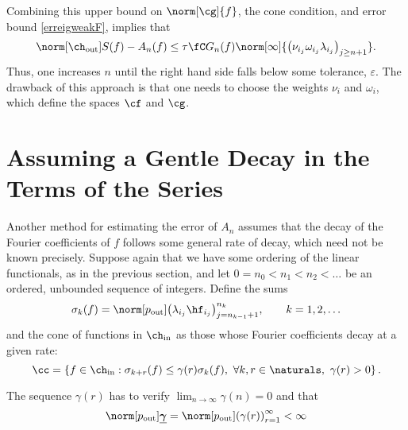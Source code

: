 \documentclass[final]{elsarticle}
\newcommand{\chin}{\ch_{\text{\rm{in}}}}
\newcommand{\chout}{\ch_{\text{\rm{out}}}}
\newcommand{\pout}{p_{\text{\rm{out}}}}
\newcommand{\bgamma}{\underline{\boldsymbol\gamma}}
\theoremstyle{definition}
\theoremstyle{remark}
\begin{document}
Combining this upper bound on $\norm[\cg]{f}$, the cone condition, and error bound \eqref{erreigweakF}, implies that
\begin{equation*}
\norm[\chout]{S(f)-A_n(f)} \le \tau \fC G_n(f) \norm[\infty]{\left(\nu_{i_j} \omega_{i_j} \lambda_{i_j} \right)_{j\ge n+1}}.
\end{equation*}
Thus, one increases $n$ until the right hand side falls below some tolerance, $\varepsilon$.  The drawback of this approach is that one needs to choose the weights $\nu_i$ and $\omega_i$, which define the spaces $\cf$ and $\cg$.




\section{Assuming a Gentle Decay in the Terms of the Series}

Another method for estimating the error of $A_n$ assumes that the decay of the Fourier coefficients of $f$ follows some general rate of decay, which need not be known precisely.  Suppose again that we have some ordering of the linear functionals, as in the previous section, and let $0=n_0 < n_1 < n_2 < \ldots$ be an ordered, unbounded sequence of integers.  Define the sums
\begin{equation} \label{sumdef}
\sigma_k(f) = \norm[\pout]{ \left(\lambda_{i_j} \hf_{i_j} \right)_{j=n_{k-1}+1}^{n_k}}, \qquad k=1, 2, \ldots
\end{equation}
and the cone of functions in $\chin$ as those whose Fourier coefficients decay at a given rate:
\begin{equation} \label{decayconedef}
\cc = \left\{ f \in \chin : \sigma_{k+r}(f) \le \gamma(r) \sigma_k (f), \ \forall k,r \in \naturals, \ \gamma(r) > 0 \right\}.
\end{equation}

The sequence $\gamma(r)$ has to verify $\lim_{n\rightarrow\infty}\gamma(n)=0$ and that
\begin{equation} \label{constcone}
\norm[\pout]{\bgamma}=\norm[\pout]{ \left(\gamma(r)\right)_{r=1}^\infty}<\infty
\end{equation}
\end{document}
